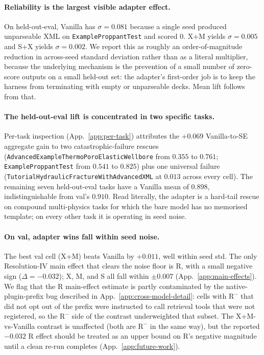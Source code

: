 \documentclass{article}
\begin{document}
\paragraph{Reliability is the largest visible adapter effect.} On held-out-eval, Vanilla has $\sigma=0.081$ because a single seed produced unparseable XML on \texttt{ExampleProppantTest} and scored 0. X+M yields $\sigma=0.005$ and S+X yields $\sigma=0.002$. We report this as roughly an order-of-magnitude reduction in across-seed standard deviation rather than as a literal multiplier, because the underlying mechanism is the prevention of a small number of zero-score outputs on a small held-out set: the adapter's first-order job is to keep the harness from terminating with empty or unparseable decks. Mean lift follows from that.

\paragraph{The held-out-eval lift is concentrated in two specific tasks.}\label{subsec:per-task} Per-task inspection (App.~\ref{app:per-task}) attributes the $+0.069$ Vanilla-to-SE aggregate gain to two catastrophic-failure rescues (\texttt{AdvancedExampleThermoPoroElasticWellbore} from $0.355$ to $0.761$; \texttt{ExampleProppantTest} from $0.541$ to $0.825$) plus one universal failure (\texttt{TutorialHydraulicFractureWithAdvancedXML} at $0.013$ across every cell). The remaining seven held-out-eval tasks have a Vanilla mean of $0.898$, indistinguishable from val's $0.910$. Read literally, the adapter is a hard-tail rescue on compound multi-physics tasks for which the bare model has no memorised template; on every other task it is operating in seed noise.

\paragraph{On val, adapter wins fall within seed noise.} The best val cell (X+M) beats Vanilla by $+0.011$, well within seed std. The only Resolution-IV main effect that clears the noise floor is R, with a small negative sign ($\Delta = -0.032$); X, M, and S all fall within $\pm 0.007$ (App.~\ref{app:main-effects}). We flag that the R main-effect estimate is partly contaminated by the native-plugin-prefix bug described in App.~\ref{app:cross-model-detail}: cells with $\mathrm{R^-}$ that did not opt out of the prefix were instructed to call retrieval tools that were not registered, so the $\mathrm{R^-}$ side of the contrast underweighted that subset. The X+M-vs-Vanilla contrast is unaffected (both are $\mathrm{R^-}$ in the same way), but the reported $-0.032$ R effect should be treated as an upper bound on R's negative magnitude until a clean re-run completes (App.~\ref{app:future-work}).
\end{document}
